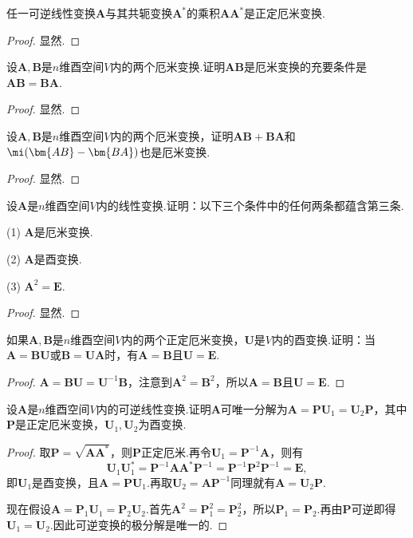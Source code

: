 \begin{prob}[20]
	任一可逆线性变换$\bm A$与其共轭变换$\bm A^*$的乘积$\bm A\bm A^*$是正定厄米变换.
\end{prob}
\begin{proof}
	显然.
\end{proof}
\begin{prob}[21]
	设$\bm A,\bm B$是$n$维酉空间$V$内的两个厄米变换.证明$\bm{AB}$是厄米变换的充要条件是$\bm{AB}=\bm{BA}$.
\end{prob}
\begin{proof}
	显然.
\end{proof}
\begin{prob}[22]
	设$\bm A,\bm B$是$n$维酉空间$V$内的两个厄米变换，证明$\bm{AB}+\bm{BA}$和$\mi(\bm{AB}-\bm{BA})$也是厄米变换.
\end{prob}
\begin{proof}
	显然.
\end{proof}
\begin{prob}[23]
	设$\bm A$是$n$维酉空间$V$内的线性变换.证明：以下三个条件中的任何两条都蕴含第三条.\quad
	\begin{enumerate*}
		\item[(1)] $\bm A$是厄米变换.
		\item[(2)] $\bm A$是酉变换.
		\item[(3)] $\bm A^2=\bm E$.
	\end{enumerate*}
\end{prob}
\begin{proof}
	显然.
\end{proof}
\begin{prob}[24]
	如果$\bm A,\bm B$是$n$维酉空间$V$内的两个正定厄米变换，$\bm U$是$V$内的酉变换.证明：当$\bm A=\bm{BU}$或$\bm B=\bm{UA}$时，有$\bm A=\bm B$且$\bm U=\bm E$.
\end{prob}
\begin{proof}
	$\bm A=\bm{BU}=\bm U^{-1}\bm B$，注意到$\bm A^2=\bm B^2$，所以$\bm A=\bm B$且$\bm U=\bm E$.
\end{proof}
\begin{prob}[25]
	设$\bm A$是$n$维酉空间$V$内的可逆线性变换.证明$\bm A$可唯一分解\footnotemark 为$\bm A=\bm P\bm U_1=\bm U_2\bm P$，其中$\bm P$是正定厄米变换，$\bm U_1,\bm U_2$为酉变换.
\end{prob}
\begin{proof}
	取$\bm P=\sqrt{\bm A\bm A^*}$，则$\bm P$正定厄米.再令$\bm U_1=\bm P^{-1}\bm A$，则有
	\[
		\bm U_1\bm U_1^*=\bm P^{-1}\bm A\bm A^*\bm P^{-1}=\bm P^{-1}\bm P^2\bm P^{-1}=\bm E,
	\]
	即$\bm U_1$是酉变换，且$\bm A=\bm P\bm U_1$.再取$\bm U_2=\bm A\bm P^{-1}$同理就有$\bm A=\bm U_2\bm P$.

	现在假设$\bm A=\bm P_1\bm U_1=\bm P_2\bm U_2$.首先$\bm A^2=\bm P_1^2=\bm P_2^2$，所以$\bm P_1=\bm P_2$.再由$\bm P$可逆即得$\bm U_1=\bm U_2$.因此可逆变换的极分解是唯一的.
\end{proof}
